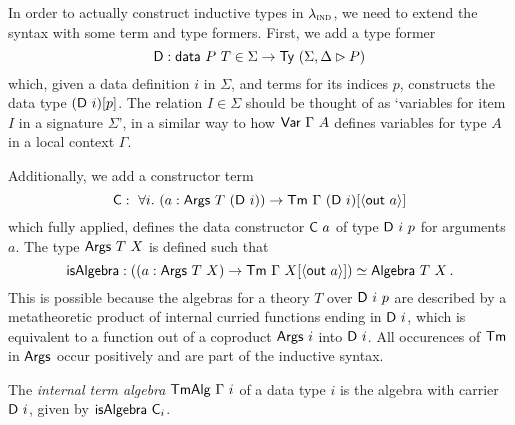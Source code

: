 In order to actually construct inductive types in $\lambda_{\textsc{ind}}$, we need to
extend the syntax with some term and type formers. First, we add a type former
\[
	\mta{D} : \mta{data}\ P\ T \in \Sigma \to \Ty\ (\Sigma, \Delta \rhd P)
\]
which, given a data definition $i$ in $\Sigma$, and terms for its
indices $p$, constructs the data type $(\mta{D}\ i)[p]$. The relation $I \in
	\Sigma$ should be thought of as `variables for item $I$ in a signature
$\Sigma$', in a similar way to how $\mta{Var}\ \Gamma\ A$ defines variables for
type $A$ in a local context $\Gamma$.

Additionally, we add a constructor term
\[
	\mta{C} :\ \forall i.\ (a : \mta{Args}\ T\ (\mta{D}\ i)) \to \Tm\ \Gamma\ (\mta{D}\ i)[\Msub{\mta{out}\ a}] \\
\]
which fully applied, defines the data constructor $\textsf{C}\ a$ of type
$\textsf{D}\ i\ p$ for arguments $a$. The type $\textsf{Args}\ T\ X$ is defined such
that
\begin{equation}
	\textsf{isAlgebra} : ((a : \textsf{Args}\ T\ X) \to \textsf{Tm}\ \Gamma\ X[\langle\textsf{out}\ a\rangle]) \simeq \textsf{Algebra}\ T\ X \,.\label{eq:args-iso}
\end{equation}
This is possible because the algebras for a theory $T$ over $\textsf{D}\ i\ p$ are
described by a metatheoretic product of internal curried functions ending in
$\mta{D}\ i$, which is equivalent to a function out of a coproduct
$\mta{Args}\ i$ into $\mta{D}\ i$. All occurences of $\textsf{Tm}$ in
$\textsf{Args}$ occur positively and are part of the inductive syntax.

\begin{definition}
	The \emph{internal term algebra} $\textsf{TmAlg}\ \Gamma\ i$ of a data type $i$ is
	the algebra with carrier $\mta{D}\ i$, given by $\mta{isAlgebra}\ \mta{C}_i$.
\end{definition}

